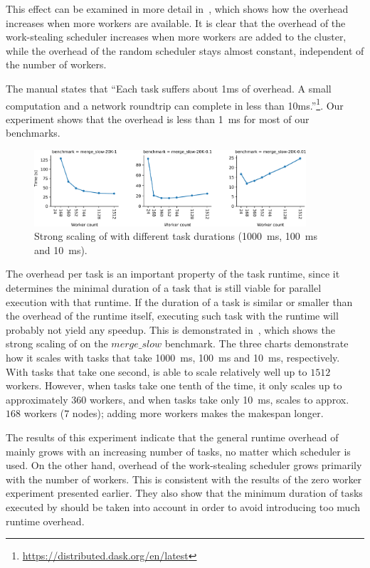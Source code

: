 This effect can be examined in more detail in~, which shows how the
overhead increases when more workers are available. It is clear that the overhead of the
work-stealing scheduler increases when more workers are added to the cluster, while the overhead of
the random scheduler stays almost constant, independent of the number of workers.

The \dask{} manual states that ``Each task suffers about 1ms of overhead. A
small computation and a network roundtrip can complete in less than
10ms.''\footnote{\url{https://distributed.dask.org/en/latest}}. Our experiment shows that the overhead is less than
\SI{1}{\milli\second} for most of our benchmarks.

\begin{figure}
	\centering
	\includegraphics[width=0.9\textwidth]{imgs/rsds/charts/dask-strong-scaling}
	\caption{Strong scaling of \dask{} with different task durations
	(\SI{1000}{\milli\second}, \SI{100}{\milli\second} and \SI{10}{\milli\second}).}
	\label{fig:dask-strong-scaling}
\end{figure}

The overhead per task is an important property of the task runtime, since it determines the minimal
duration of a task that is still viable for parallel execution with that runtime. If the duration
of a task is similar or smaller than the overhead of the runtime itself, executing such task with
the runtime will probably not yield any speedup. This is demonstrated
in~, which shows the strong scaling of \dask{} on
the $merge\_slow$ benchmark. The three charts demonstrate how it scales with tasks
that take \SI{1000}{\milli\second}, \SI{100}{\milli\second} and \SI{10}{\milli\second},
respectively. With tasks that take one second, \dask{} is able to scale
relatively well up to $1512$ workers. However, when tasks take one tenth of the
time, it only scales up to approximately $360$ workers, and when tasks take
only \SI{10}{\milli\second}, \dask{} scales to approx.
$168$ workers ($7$ nodes); adding more workers makes
the makespan longer.

The results of this experiment indicate that the general runtime overhead of
\dask{} mainly grows with an increasing number of tasks, no matter which
scheduler is used. On the other hand, overhead of the work-stealing scheduler grows primarily with
the number of workers. This is consistent with the results of the zero worker experiment presented
earlier. They also show that the minimum duration of tasks executed by \dask{}
should be taken into account in order to avoid introducing too much runtime overhead.

